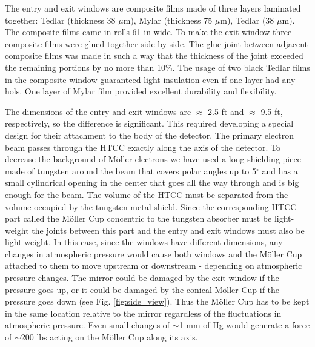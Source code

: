 The entry and exit windows are composite films made of three layers laminated together: Tedlar (thickness 38 $\mu$m), Mylar (thickness 75 $\mu$m), Tedlar (38 $\mu$m). The composite films came in rolls 61 in wide. To make the exit window three composite films were glued together side by side. The glue joint between adjacent composite films was made in such a way that the thickness of the joint exceeded the remaining portions by no more than 10\%. The usage of two black Tedlar films in the composite window guaranteed light insulation even if one layer had any hols. One layer of Mylar film provided excellent durability and flexibility.

The dimensions of the entry and exit windows are $\approx$ 2.5 ft and $\approx$ 9.5 ft, respectively, so the difference is significant. This required developing a special design for their attachment to the body of the detector. The primary electron beam passes through the HTCC exactly along the axis of the detector. To decrease the background of M{\" o}ller electrons we have used a long shielding piece made of tungsten around the beam that covers polar angles up to 5$^\circ$ and has a small cylindrical opening in the center that goes all the way through and is big enough for the beam. The volume of the HTCC must be separated from the volume occupied by the tungsten metal shield. Since the corresponding HTCC part called the M{\" o}ller  Cup concentric to the tungsten absorber must be light-weight the joints between this part and the entry and exit windows  must also be light-weight. In this case, since the windows have different dimensions, any changes in atmospheric pressure would cause both windows and the M{\" o}ller  Cup attached to them to move upstream or downstream - depending on atmospheric pressure changes. The mirror could be damaged by the exit window if the pressure goes up, or it could be damaged by the conical M{\" o}ller  Cup if the pressure goes down (see Fig. \ref{fig:side_view}). Thus the M{\" o}ller  Cup has to be kept in the same location relative to the mirror regardless of the fluctuations in atmospheric pressure. Even small changes of $\sim$1 mm of Hg would generate a force of $\sim$200 lbs acting on the M{\" o}ller  Cup along its axis.  

